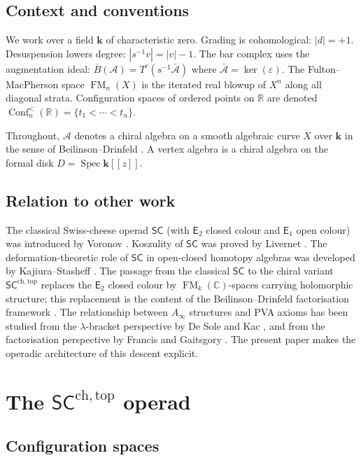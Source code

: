\documentclass[11pt,reqno]{amsart}
\theoremstyle{definition}
\theoremstyle{remark}
\newcommand{\cA}{\mathcal{A}}
\newcommand{\CC}{\mathbb{C}}
\newcommand{\RR}{\mathbb{R}}
\providecommand{\Bbbk}{\mathbf{k}}
\newcommand{\barB}{\overline{B}}
\newcommand{\barA}{\bar{\cA}}
\newcommand{\Ainf}{A_{\infty}}
\newcommand{\Eone}{\mathsf{E}_{1}}
\newcommand{\Etwo}{\mathsf{E}_{2}}
\newcommand{\SC}{\mathsf{SC}}
\newcommand{\SCchtop}{\mathsf{SC}^{\mathrm{ch,top}}}
\DeclareMathOperator{\Conf}{Conf}
\DeclareMathOperator{\FM}{FM}
\DeclareMathOperator{\Spec}{Spec}
\numberwithin{equation}{section}
\begin{document}
\subsection{Context and conventions}

We work over a field $\Bbbk$ of characteristic zero.  Grading
is cohomological: $|d| = +1$.  Desuspension lowers degree:
$|s^{-1}v| = |v| - 1$.  The bar complex uses the augmentation
ideal: $\barB(\cA) = T^c(s^{-1}\barA)$ where
$\barA = \ker(\varepsilon)$.  The Fulton--MacPherson space
$\FM_n(X)$ is the iterated real blowup of $X^n$ along all
diagonal strata.  Configuration spaces of ordered points on
$\RR$ are denoted $\Conf_n^{<}(\RR) = \{t_1 < \cdots < t_n\}$.

Throughout, $\cA$ denotes a chiral algebra on a smooth algebraic
curve $X$ over $\Bbbk$ in the sense of Beilinson--Drinfeld
\cite{BD04}.  A vertex algebra is a chiral algebra on the
formal disk $D = \Spec\Bbbk[[z]]$.

\subsection{Relation to other work}

The classical Swiss-cheese operad $\SC$ (with $\Etwo$ closed
colour and $\Eone$ open colour) was introduced by Voronov
\cite{Vor99}.  Koszulity of $\SC$ was proved by Livernet
\cite{Liv06}.  The deformation-theoretic role of $\SC$ in
open-closed homotopy algebras was developed by Kajiura--Stasheff
\cite{KS06}.  The passage from the classical $\SC$ to the chiral
variant $\SCchtop$ replaces the $\Etwo$ closed colour by
$\FM_k(\CC)$-spaces carrying holomorphic structure; this
replacement is the content of the Beilinson--Drinfeld
factorisation framework \cite{BD04}.  The relationship between
$\Ainf$ structures and PVA axioms has been studied from the
$\lambda$-bracket perspective by De Sole and Kac \cite{DSK06},
and from the factorisation perspective by Francis and Gaitsgory
\cite{FG12}.  The present paper makes the operadic architecture
of this descent explicit.


\section{The $\SCchtop$ operad}
\label{sec:SC-operad}

\subsection{Configuration spaces}
\end{document}
